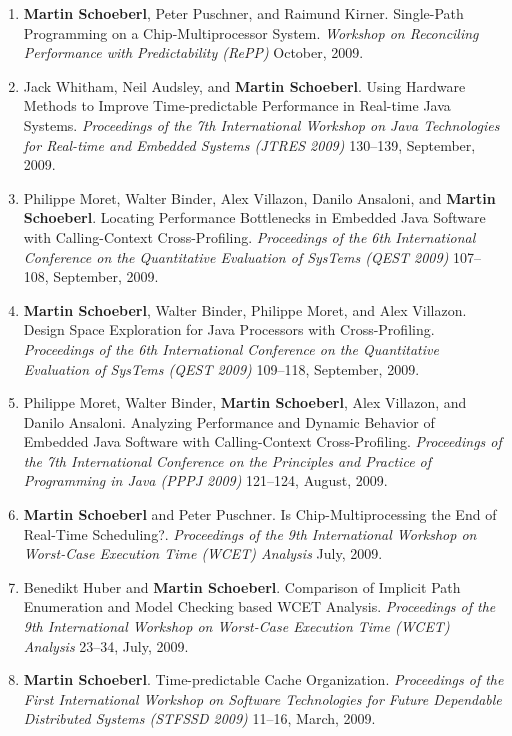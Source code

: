 \begin{enumerate}
\item {\bf Martin Schoeberl}, Peter Puschner, and Raimund Kirner.
 Single-Path Programming on a Chip-Multiprocessor System.
 \emph{Workshop on Reconciling Performance with Predictability (RePP)} October, 2009.

\item Jack Whitham, Neil Audsley, and {\bf Martin Schoeberl}.
 Using Hardware Methods to Improve Time-predictable Performance in Real-time Java Systems.
 \emph{Proceedings of the 7th International Workshop on Java Technologies for Real-time and Embedded Systems (JTRES 2009)} 130--139, September, 2009.

\item Philippe Moret, Walter Binder, Alex Villazon, Danilo Ansaloni, and {\bf Martin Schoeberl}.
 Locating Performance Bottlenecks in Embedded Java Software with Calling-Context Cross-Profiling.
 \emph{Proceedings of the 6th International Conference on the Quantitative Evaluation of SysTems (QEST 2009)} 107--108, September, 2009.

\item {\bf Martin Schoeberl}, Walter Binder, Philippe Moret, and Alex Villazon.
 Design Space Exploration for Java Processors with Cross-Profiling.
 \emph{Proceedings of the 6th International Conference on the Quantitative Evaluation of SysTems (QEST 2009)} 109--118, September, 2009.

\item Philippe Moret, Walter Binder, {\bf Martin Schoeberl}, Alex Villazon, and Danilo Ansaloni.
 Analyzing Performance and Dynamic Behavior of Embedded Java Software with Calling-Context Cross-Profiling.
 \emph{Proceedings of the 7th International Conference on the Principles and Practice of Programming in Java (PPPJ 2009)} 121--124, August, 2009.

\item {\bf Martin Schoeberl} and Peter Puschner.
 Is Chip-Multiprocessing the End of Real-Time Scheduling?.
 \emph{Proceedings of the 9th International Workshop on Worst-Case Execution Time (WCET) Analysis} July, 2009.

\item Benedikt Huber and {\bf Martin Schoeberl}.
 Comparison of Implicit Path Enumeration and Model Checking based WCET Analysis.
 \emph{Proceedings of the 9th International Workshop on Worst-Case Execution Time (WCET) Analysis} 23--34, July, 2009.

\item {\bf Martin Schoeberl}.
 Time-predictable Cache Organization.
 \emph{Proceedings of the First International Workshop on Software Technologies for Future Dependable Distributed Systems (STFSSD 2009)} 11--16, March, 2009.


\end{enumerate}
